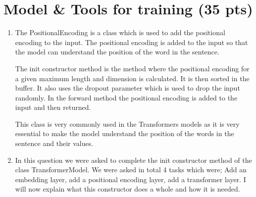 \documentclass[a4paper]{article}
\begin{document}
\section{Model \& Tools for training (35 pts)}
\begin{enumerate}
    \item The PositionalEncoding is a class which is used to add the positional encoding to the input. The positional encoding is added to the input so that the model can understand the position of the word in the sentence.

          The init constructor method is the method where the positional encoding for a given maximum length and dimension is calculated. It is then sorted in the buffer. It also uses the dropout parameter which is used to drop the input randomly. In the forward method the positional encoding is added to the input and then returned.

          This class is very commonly used in the Transformers models as it is very essential to make the model understand the position of the words in the sentence and their values.
    \item In this question we were asked to complete the init constructor method of the class TransformerModel. We were asked in total 4 tasks which were; Add an embedding layer, add a positional encoding layer, add a transformer layer. I will now explain what this constructor does a whole and how it is needed.


\end{enumerate}
\end{document}
